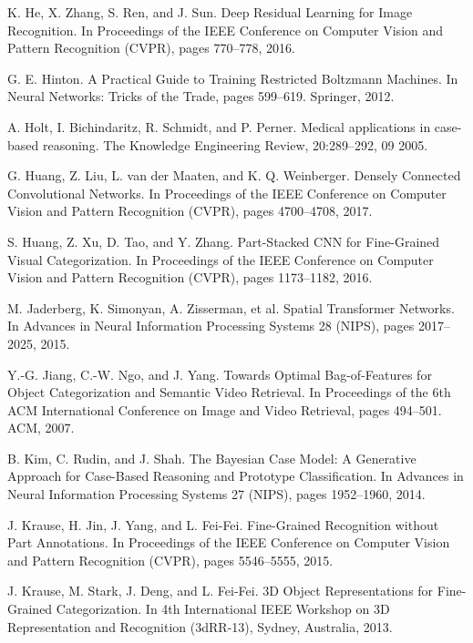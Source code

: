 \documentclass{article}
\theoremstyle{definition}
\theoremstyle{remark}
\begin{document}
\begin{thebibliography}{}
 K. He, X. Zhang, S. Ren, and J. Sun. Deep Residual Learning for Image Recognition. In Proceedings of the IEEE Conference on Computer Vision and Pattern Recognition (CVPR), pages 770–778, 2016.

 G. E. Hinton. A Practical Guide to Training Restricted Boltzmann Machines. In Neural Networks: Tricks of the Trade, pages 599–619. Springer, 2012.

 A. Holt, I. Bichindaritz, R. Schmidt, and P. Perner. Medical applications in case-based reasoning. The Knowledge Engineering Review, 20:289–292, 09 2005.

 G. Huang, Z. Liu, L. van der Maaten, and K. Q. Weinberger. Densely Connected Convolutional Networks. In Proceedings of the IEEE Conference on Computer Vision and Pattern Recognition (CVPR), pages 4700–4708, 2017.

 S. Huang, Z. Xu, D. Tao, and Y. Zhang. Part-Stacked CNN for Fine-Grained Visual Categorization. In Proceedings of the IEEE Conference on Computer Vision and Pattern Recognition (CVPR), pages 1173–1182, 2016.

 M. Jaderberg, K. Simonyan, A. Zisserman, et al. Spatial Transformer Networks. In Advances in Neural Information Processing Systems 28 (NIPS), pages 2017–2025, 2015.

 Y.-G. Jiang, C.-W. Ngo, and J. Yang. Towards Optimal Bag-of-Features for Object Categorization and Semantic Video Retrieval. In Proceedings of the 6th ACM International Conference on Image and Video Retrieval, pages 494–501. ACM, 2007.

 B. Kim, C. Rudin, and J. Shah. The Bayesian Case Model: A Generative Approach for Case-Based Reasoning and Prototype Classification. In Advances in Neural Information Processing Systems 27 (NIPS), pages 1952–1960, 2014.

 J. Krause, H. Jin, J. Yang, and L. Fei-Fei. Fine-Grained Recognition without Part Annotations. In Proceedings of the IEEE Conference on Computer Vision and Pattern Recognition (CVPR), pages 5546–5555, 2015.

 J. Krause, M. Stark, J. Deng, and L. Fei-Fei. 3D Object Representations for Fine-Grained Categorization. In 4th International IEEE Workshop on 3D Representation and Recognition (3dRR-13), Sydney, Australia, 2013.


\end{thebibliography}
\end{document}
